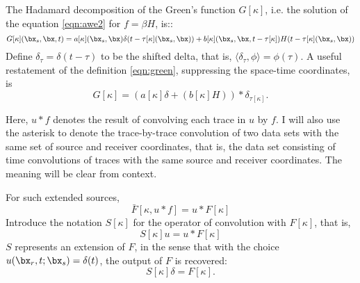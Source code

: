 The Hadamard
decomposition of the Green's function $G[\kappa]$, i.e. the solution of the
equation \ref{eqn:awe2} for $f = \beta H$, is::
\begin{equation}
  \label{eqn:green}
  G[\kappa](\bx_s,\bx,t) = a[\kappa](\bx_s,\bx)\delta(t - \tau[\kappa](\bx_s,\bx)) +
  b[\kappa](\bx_s,\bx,t-\tau[\kappa])H(t - \tau[\kappa](\bx_s,\bx))
\end{equation}
Define $\delta_{\tau} = \delta(t-\tau)$ to be the shifted delta, that
is, $\langle \delta_{\tau},\phi\rangle = \phi(\tau)$. A useful
restatement of the definition \ref{eqn:green}, suppressing the
space-time coordinates, is
\begin{equation}
  \label{eqn:regreen}
  G[\kappa] = (a[\kappa]\delta +  (b[\kappa]H))*\delta_{\tau[\kappa]}.
\end{equation}

Here, $u*f$ denotes the result of convolving each trace in $u$ by $f$. I
will also use the asterisk to denote the trace-by-trace convolution
of two data sets with the same set of source and receiver coordinates,
that is, the data set consisting of time convolutions of traces with the same source
and receiver coordinates. The meaning will be clear from context.

For such extended sources,
\[
  \bar{F}[\kappa,u*f] = u*F[\kappa]
\]
Introduce the notation $S[\kappa]$ for the operator of convolution
with $F[\kappa]$, that is,
\begin{equation}
  \label{eqn:sdef}
  S[\kappa]u = u*F[\kappa]
\end{equation}
$S$ represents an
extension of $F$, in the sense that with the choice
$u(\bx_r,t;\bx_s)=\delta(t)$, the output of $F$ is recovered:
\begin{equation}
  \label{eqn:sconsist}
  S[\kappa]\delta = F[\kappa].
\end{equation}


